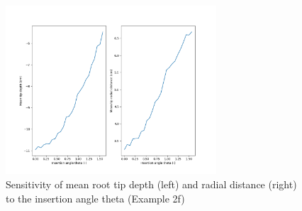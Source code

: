 \begin{figure}
\centering
\includegraphics[width=0.7\textwidth]{example_4b.png}
\caption{Sensitivity of mean root tip depth (left) and radial distance (right) to the insertion angle theta (Example 2f) } \label{fig:sensitivity}
\end{figure}

